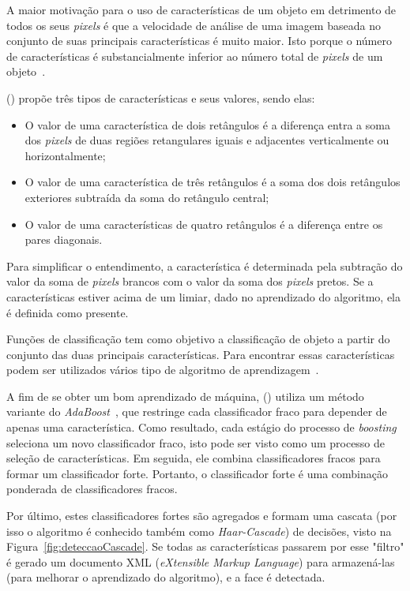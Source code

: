 A maior motivação para o uso de características de um objeto em detrimento de todos os seus \textit{pixels} é que a velocidade de análise de uma imagem baseada no conjunto de suas principais características é muito maior. Isto porque o número de características é substancialmente inferior ao número total de \textit{pixels} de um objeto~\cite{peixoto2012deteccao}.

\citeauthor{viola2001rapid} (\citeyear{viola2001rapid}) propõe três tipos de características e seus valores, sendo elas:
\begin{itemize}
    \item O valor de uma característica de dois retângulos é a diferença entra a soma dos \textit{pixels} de duas regiões retangulares iguais e adjacentes verticalmente ou horizontalmente;
    \item O valor de uma característica de três retângulos é a soma dos dois retângulos exteriores subtraída da soma do retângulo central;
    \item O valor de uma características de quatro retângulos é a diferença entre os pares diagonais.
\end{itemize}

Para simplificar o entendimento, a característica é determinada pela subtração do valor da soma de \textit{pixels} brancos com o valor da soma dos \textit{pixels} pretos. Se a características estiver acima de um limiar, dado no aprendizado do algoritmo, ela é definida como presente.

Funções de classificação tem como objetivo a classificação de objeto a partir do conjunto das duas principais características. Para encontrar essas características podem ser utilizados vários tipo de algoritmo de aprendizagem~\cite{peixoto2012deteccao}.

A fim de se obter um bom aprendizado de máquina, \citeauthor{viola2001rapid} (\citeyear{viola2001rapid}) utiliza um método variante do \textit{AdaBoost}~\cite{freund1999short}, que restringe cada classificador fraco para depender de apenas uma característica. Como resultado, cada estágio do processo de \textit{boosting} seleciona um novo classificador fraco, isto pode ser visto como um processo de seleção de características. Em seguida, ele combina classificadores fracos para formar um classificador forte. Portanto, o classificador forte é uma combinação ponderada de classificadores fracos.

Por último, estes classificadores fortes são agregados e formam uma cascata (por isso o algoritmo é conhecido também como \textit{Haar-Cascade}) de decisões, visto na Figura~\ref{fig:deteccaoCascade}. Se todas as características passarem por esse "filtro" é gerado um documento XML (\textit{eXtensible Markup Language}) para armazená-las (para melhorar o aprendizado do algoritmo), e a face é detectada.


